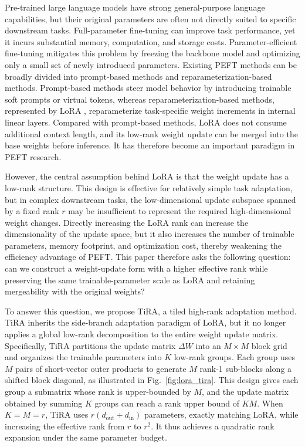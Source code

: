 \documentclass[a4paper,11pt]{article}
\newcommand{\DeltaW}{\Delta W}
\begin{document}
Pre-trained large language models have strong general-purpose language capabilities, but their original parameters are often not directly suited to specific downstream tasks. Full-parameter fine-tuning can improve task performance, yet it incurs substantial memory, computation, and storage costs. Parameter-efficient fine-tuning mitigates this problem by freezing the backbone model and optimizing only a small set of newly introduced parameters. Existing PEFT methods can be broadly divided into prompt-based methods and reparameterization-based methods. Prompt-based methods steer model behavior by introducing trainable soft prompts or virtual tokens, whereas reparameterization-based methods, represented by LoRA \cite{hu2022lora}, reparameterize task-specific weight increments in internal linear layers. Compared with prompt-based methods, LoRA does not consume additional context length, and its low-rank weight update can be merged into the base weights before inference. It has therefore become an important paradigm in PEFT research.

However, the central assumption behind LoRA is that the weight update has a low-rank structure. This design is effective for relatively simple task adaptation, but in complex downstream tasks, the low-dimensional update subspace spanned by a fixed rank $r$ may be insufficient to represent the required high-dimensional weight changes. Directly increasing the LoRA rank can increase the dimensionality of the update space, but it also increases the number of trainable parameters, memory footprint, and optimization cost, thereby weakening the efficiency advantage of PEFT. This paper therefore asks the following question: can we construct a weight-update form with a higher effective rank while preserving the same trainable-parameter scale as LoRA and retaining mergeability with the original weights?

To answer this question, we propose TiRA, a tiled high-rank adaptation method. TiRA inherits the side-branch adaptation paradigm of LoRA, but it no longer applies a global low-rank decomposition to the entire weight update matrix. Specifically, TiRA partitions the update matrix $\DeltaW$ into an $M\times M$ block grid and organizes the trainable parameters into $K$ low-rank groups. Each group uses $M$ pairs of short-vector outer products to generate $M$ rank-1 sub-blocks along a shifted block diagonal, as illustrated in Fig.~\ref{fig:lora_tira}. This design gives each group a submatrix whose rank is upper-bounded by $M$, and the update matrix obtained by summing $K$ groups can reach a rank upper bound of $KM$. When $K=M=r$, TiRA uses $r(d_{\mathrm{out}}+d_{\mathrm{in}})$ parameters, exactly matching LoRA, while increasing the effective rank from $r$ to $r^2$. It thus achieves a quadratic rank expansion under the same parameter budget.
\end{document}
